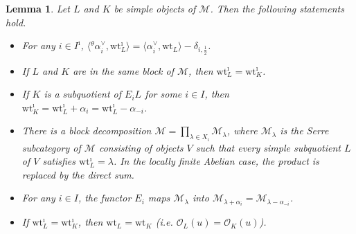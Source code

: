 \documentclass[a4,10pt]{amsart}
\numberwithin{equation}{section}
\newtheorem{Lemma}[Theorem]{Lemma}
\theoremstyle{definition}
\begin{document}
\begin{Lemma}\label{BLOCK} Let $L$ and $K$ be  simple objects  of  $\mathcal M$. Then the following statements hold.
     \begin{itemize}\item[(1)] For any  $i\in I^\imath$,   $ \langle{ }^\theta \alpha_i^\vee, {\text{wt}}^\imath_L \rangle=  \langle \alpha_i^\vee, \text{{wt}}_L\rangle-\delta_{i, \frac{1}{2}} $.
         \item [(2)] If $L$ and $K$ are in the same block of $\mathcal M$, then ${\text{wt}}^\imath_L={\text{wt}}^\imath_K $. 
         \item [(3)]  If $K$ is a subquotient of $E_iL$ for some  $i\in I$, then 
         $ {\text{wt}}^\imath_K ={\text{wt}}^\imath_L +\alpha_i={\text{wt}}^\imath_L-\alpha_{-i} $.
         \item [(4)]  There is a block decomposition $ \mathcal M=\prod_{\lambda\in  X_\imath}\mathcal M_{\lambda}$, where $\mathcal M_\lambda$ is  the Serre subcategory of $
\mathcal M$ consisting of objects $
V$ such that every simple subquotient $
L$ of $
V$ satisfies $\text{wt}^\imath_L
 =\lambda$.     In the locally    finite Abelian case, the product is replaced by the direct sum.  
         \item[(5)] For any $i\in I$, the functor  $ E_i$ maps   $\mathcal M_{\lambda}$  into $ \mathcal M_{\lambda+\alpha_i}= \mathcal M_{\lambda-\alpha_{-i}}$.      
  \item[(6)] If ${\text{wt}}^\imath_L= {\text{wt}}^\imath_K$, then $ {\text{wt}}_L= {\text{wt}}_K$ (i.e. $\mathcal O_L(u)=\mathcal O_K(u)$).     
         \end{itemize}
 \end{Lemma}
\end{document}
